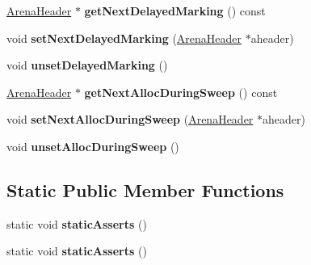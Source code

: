 \begin{DoxyCompactItemize}
\item 
\hypertarget{structjs_1_1gc_1_1_arena_header_a2509c0dea928a34e3f9d1c9121d81790}{\hyperlink{structjs_1_1gc_1_1_arena_header}{Arena\-Header} $\ast$ {\bfseries get\-Next\-Delayed\-Marking} () const }\label{structjs_1_1gc_1_1_arena_header_a2509c0dea928a34e3f9d1c9121d81790}

\item 
\hypertarget{structjs_1_1gc_1_1_arena_header_abdb262f43f1f44c4f90c8642200dd0d4}{void {\bfseries set\-Next\-Delayed\-Marking} (\hyperlink{structjs_1_1gc_1_1_arena_header}{Arena\-Header} $\ast$aheader)}\label{structjs_1_1gc_1_1_arena_header_abdb262f43f1f44c4f90c8642200dd0d4}

\item 
\hypertarget{structjs_1_1gc_1_1_arena_header_ae5f53db848a89a9bb96b21b37967931d}{void {\bfseries unset\-Delayed\-Marking} ()}\label{structjs_1_1gc_1_1_arena_header_ae5f53db848a89a9bb96b21b37967931d}

\item 
\hypertarget{structjs_1_1gc_1_1_arena_header_a6d88dccf773bdec0ce2df9b69dde8332}{\hyperlink{structjs_1_1gc_1_1_arena_header}{Arena\-Header} $\ast$ {\bfseries get\-Next\-Alloc\-During\-Sweep} () const }\label{structjs_1_1gc_1_1_arena_header_a6d88dccf773bdec0ce2df9b69dde8332}

\item 
\hypertarget{structjs_1_1gc_1_1_arena_header_a83e1fc854c0c4f5c7609cc64e406d2b5}{void {\bfseries set\-Next\-Alloc\-During\-Sweep} (\hyperlink{structjs_1_1gc_1_1_arena_header}{Arena\-Header} $\ast$aheader)}\label{structjs_1_1gc_1_1_arena_header_a83e1fc854c0c4f5c7609cc64e406d2b5}

\item 
\hypertarget{structjs_1_1gc_1_1_arena_header_abf111f8b6c61130550eb5e26ca3e45ad}{void {\bfseries unset\-Alloc\-During\-Sweep} ()}\label{structjs_1_1gc_1_1_arena_header_abf111f8b6c61130550eb5e26ca3e45ad}

\end{DoxyCompactItemize}
\subsection*{Static Public Member Functions}
\begin{DoxyCompactItemize}
\item 
\hypertarget{structjs_1_1gc_1_1_arena_header_a3a4d563b760032a3921a0a9b1380fd5b}{static void {\bfseries static\-Asserts} ()}\label{structjs_1_1gc_1_1_arena_header_a3a4d563b760032a3921a0a9b1380fd5b}

\item 
\hypertarget{structjs_1_1gc_1_1_arena_header_a3a4d563b760032a3921a0a9b1380fd5b}{static void {\bfseries static\-Asserts} ()}\label{structjs_1_1gc_1_1_arena_header_a3a4d563b760032a3921a0a9b1380fd5b}

\end{DoxyCompactItemize}
